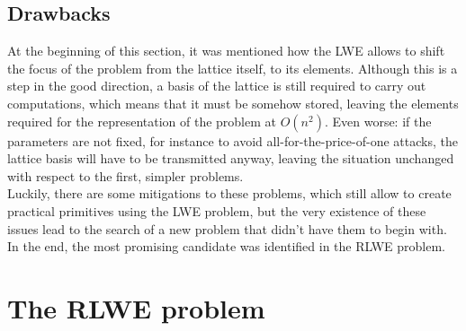 
\subsection{Drawbacks}
At the beginning of this section, it was mentioned how the LWE allows to shift the focus of the problem from the lattice itself, to its elements. Although this is a step in the good direction, a basis of the lattice is still required to carry out computations, which means that it must be somehow stored, leaving the elements required for the representation of the problem at $O(n^2)$. Even worse: if the parameters are not fixed, for instance to avoid all-for-the-price-of-one attacks, the lattice basis will have to be transmitted anyway, leaving the situation unchanged with respect to the first, simpler problems.\\
Luckily, there are some mitigations to these problems, which still allow to create practical primitives using the LWE problem, but the very existence of these issues lead to the search of a new problem that didn't have them to begin with. In the end, the most promising candidate was identified in the RLWE problem.

\section{The RLWE problem}



